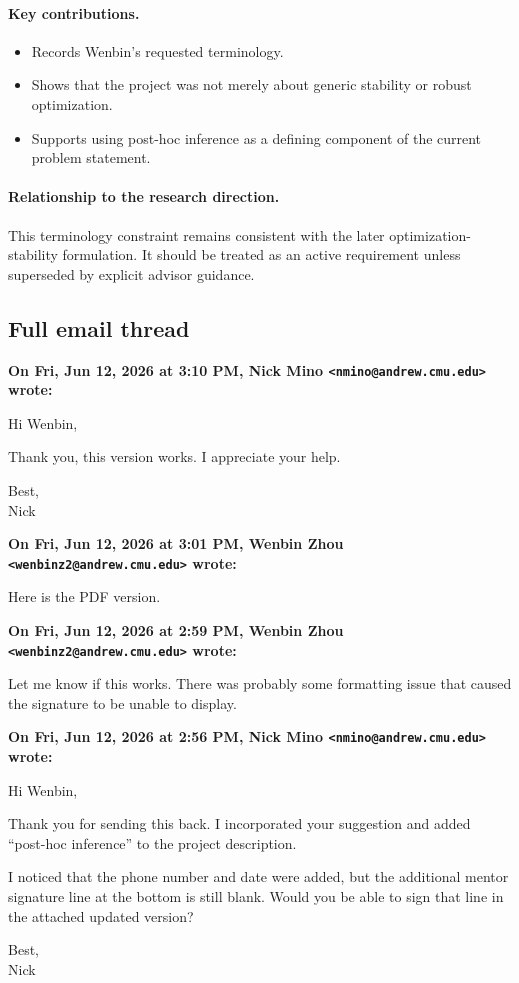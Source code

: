 \documentclass[11pt]{article}
\newcommand{\Email}[3]{%
  \medskip\noindent\textbf{On #1, #2 wrote:}\par\nobreak
  \begingroup\RaggedRight #3\par\endgroup
}
\begin{document}
\paragraph{Key contributions.}
\begin{itemize}[leftmargin=*,itemsep=0.25em]
  \item Records Wenbin's requested terminology.
  \item Shows that the project was not merely about generic stability or robust
        optimization.
  \item Supports using post-hoc inference as a defining component of the
        current problem statement.
\end{itemize}

\paragraph{Relationship to the research direction.}
This terminology constraint remains consistent with the later
optimization-stability formulation. It should be treated as an active
requirement unless superseded by explicit advisor guidance.

\subsection*{Full email thread}
\Email{Fri, Jun 12, 2026 at 3:10 PM}{Nick Mino
\texttt{<nmino@andrew.cmu.edu>}}{%
Hi Wenbin,

Thank you, this version works. I appreciate your help.

Best,\\
Nick}

\Email{Fri, Jun 12, 2026 at 3:01 PM}{Wenbin Zhou
\texttt{<wenbinz2@andrew.cmu.edu>}}{%
Here is the PDF version.}

\Email{Fri, Jun 12, 2026 at 2:59 PM}{Wenbin Zhou
\texttt{<wenbinz2@andrew.cmu.edu>}}{%
Let me know if this works. There was probably some formatting issue that caused
the signature to be unable to display.}

\Email{Fri, Jun 12, 2026 at 2:56 PM}{Nick Mino
\texttt{<nmino@andrew.cmu.edu>}}{%
Hi Wenbin,

Thank you for sending this back. I incorporated your suggestion and added
``post-hoc inference'' to the project description.

I noticed that the phone number and date were added, but the additional mentor
signature line at the bottom is still blank. Would you be able to sign that
line in the attached updated version?

Best,\\
Nick}
\end{document}
